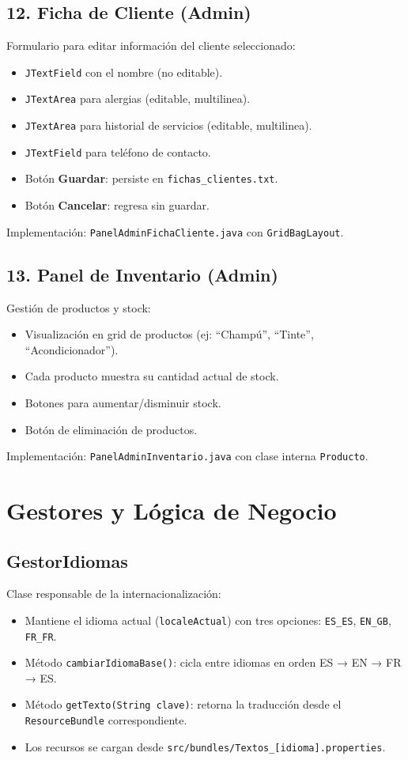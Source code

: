 \documentclass[12pt,a4paper]{report}
\begin{document}
\subsection{12. Ficha de Cliente (Admin)}
Formulario para editar información del cliente seleccionado:
\begin{itemize}
    \item \texttt{JTextField} con el nombre (no editable).
    \item \texttt{JTextArea} para alergias (editable, multilinea).
    \item \texttt{JTextArea} para historial de servicios (editable, multilinea).
    \item \texttt{JTextField} para teléfono de contacto.
    \item Botón \textbf{Guardar}: persiste en \texttt{fichas_clientes.txt}.
    \item Botón \textbf{Cancelar}: regresa sin guardar.
\end{itemize}
Implementación: \texttt{PanelAdminFichaCliente.java} con \texttt{GridBagLayout}.

\subsection{13. Panel de Inventario (Admin)}
Gestión de productos y stock:
\begin{itemize}
    \item Visualización en grid de productos (ej: ``Champú'', ``Tinte'', ``Acondicionador'').
    \item Cada producto muestra su cantidad actual de stock.
    \item Botones para aumentar/disminuir stock.
    \item Botón de eliminación de productos.
\end{itemize}
Implementación: \texttt{PanelAdminInventario.java} con clase interna \texttt{Producto}.

\section{Gestores y Lógica de Negocio}

\subsection{GestorIdiomas}
Clase responsable de la internacionalización:
\begin{itemize}
    \item Mantiene el idioma actual (\texttt{localeActual}) con tres opciones: \texttt{ES\_ES}, \texttt{EN\_GB}, \texttt{FR\_FR}.
    \item Método \texttt{cambiarIdiomaBase()}: cicla entre idiomas en orden ES → EN → FR → ES.
    \item Método \texttt{getTexto(String clave)}: retorna la traducción desde el \texttt{ResourceBundle} correspondiente.
    \item Los recursos se cargan desde \texttt{src/bundles/Textos\_[idioma].properties}.
\end{itemize}
\end{document}
